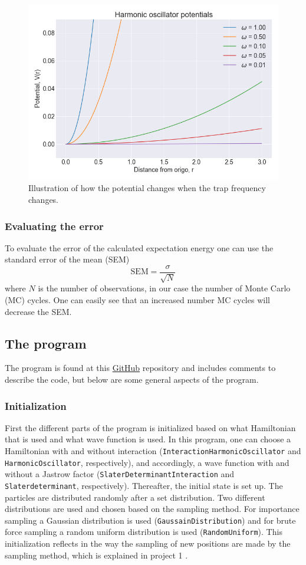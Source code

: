 \begin{figure}[H]
\center
\includegraphics[width=0.7\linewidth]{../Results/harmonic_oscialltor_potentials}\caption{Illustration of how the potential changes when the trap frequency changes. }\label{fig:harmonic_oscillator_potential}
\end{figure}

\subsubsection{Evaluating the error}

To evaluate the error of the calculated expectation energy one can use the standard error of the mean (SEM)
\begin{equation}
\text{SEM} = \frac{\sigma}{\sqrt{N}}
\end{equation}
where $N$ is the number of observations, in our case the number of Monte Carlo (MC) cycles. One can easily see that an increased number MC cycles will decrease the SEM.

\subsection{The program}

The program is found at this \href{https://github.com/vildemjo/vmc_fermions}{GitHub} repository and includes comments to describe the code, but below are some general aspects of the program.

\subsubsection{Initialization}

First the different parts of the program is initialized based on what Hamiltonian that is used and what wave function is used. In this program, one can choose a Hamiltonian with and without interaction (\texttt{InteractionHarmonicOscillator} and \texttt{HarmonicOscillator}, respectively), and accordingly, a wave function with and without a Jastrow factor (\texttt{SlaterDeterminantInteraction} and \texttt{Slaterdeterminant}, respectively). Thereafter, the initial state is set up. The particles are distributed randomly after a set distribution. Two different distributions are used and chosen based on the sampling method. For importance sampling a Gaussian distribution is used (\texttt{GaussainDistribution}) and for brute force sampling a random uniform distribution is used (\texttt{RandomUniform}). This initialization reflects in the way the sampling of new positions are made by the sampling method, which is explained in project 1 \cite{project1}.

